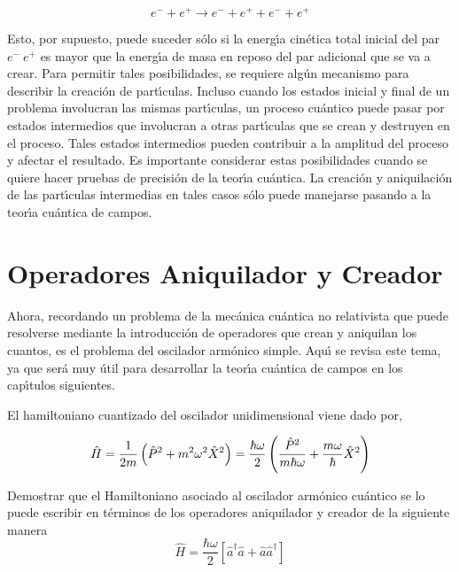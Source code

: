 \begin{equation}
e^{-}+e^{+}\rightarrow e^{-}+e^{+}+e^{-}+e^{+}  \label{2}
\end{equation}

Esto, por supuesto, puede suceder s\'{o}lo si la energ\'{\i}a cin\'{e}tica total inicial del par $e^{-}~e^{+}$ es mayor que la energ\'{\i}a de masa en reposo del par adicional que se va a crear. Para permitir tales posibilidades, se requiere alg\'{u}n mecanismo para describir la creaci\'{o}n de part\'{\i}culas. Incluso cuando los estados inicial y final de un problema involucran las mismas part\'{\i}culas, un proceso cu\'{a}ntico puede pasar por estados intermedios que involucran a otras part\'{\i}culas que se crean y destruyen en el proceso. Tales estados intermedios pueden contribuir a la amplitud del proceso y afectar el resultado. Es importante considerar estas posibilidades cuando se quiere hacer pruebas de precisi\'{o}n de la teor\'{\i}a cu\'{a}ntica. La creaci\'{o}n y aniquilaci\'{o}n de las part\'{\i}culas intermedias en tales casos s\'{o}lo puede manejarse pasando a la teor\'{\i}a cu\'{a}ntica de campos.


\section{Operadores Aniquilador y Creador}

\newcommand{\Oaa}{\hat{a}}

Ahora, recordando un problema de la mec\'{a}nica cu\'{a}ntica no relativista que puede resolverse mediante la introducci\'{o}n de operadores que crean y aniquilan los cuantos, es el problema del oscilador arm\'{o}nico simple. Aqu\'{\i} se revisa este tema, ya que ser\'{a} muy \'{u}til para desarrollar la teor\'{\i}a cu\'{a}ntica de campos en los cap\'{\i}tulos siguientes.

El hamiltoniano cuantizado del oscilador unidimensional viene dado por,

\begin{equation}
\hat{H}=\frac{1}{2m}\left( \hat{P}^{2}+m^{2}\omega ^{2}\hat{X}^{2}\right) =%
\frac{\hbar \omega }{2}\left( \frac{\hat{P}^{2}}{m\hbar \omega }+\frac{%
m\omega }{\hbar }\hat{X}^{2}\right)  \label{3}
\end{equation}

\begin{exercise}
Demostrar que el Hamiltoniano asociado al oscilador armónico cuántico se lo puede escribir en términos de los operadores aniquilador y creador de la siguiente manera
\begin{equation*}
\hat{H}=\frac{\hbar \omega }{2}\left[ \Oaa^{\dagger }\Oaa+\Oaa \Oaa^{\dagger }\right] 
\end{equation*}
\end{exercise} 

